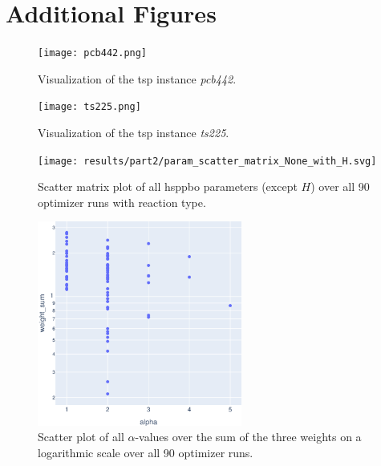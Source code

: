 \chapter{Additional Figures}
\label{chap:figures}

\begin{figure}[h]
	\centering
	\texttt{[image: pcb442.png]}
	\caption{Visualization of the \gls{tsp} instance \textit{pcb442}.}
	\label{fig:pcb442}
\end{figure}
\begin{figure}[h]
	\centering
	\texttt{[image: ts225.png]}
	\caption{Visualization of the \gls{tsp} instance \textit{ts225}.}
	\label{fig:ts225}
\end{figure}

\begin{figure}[h]
	\centering
	\texttt{[image: results/part2/param\_scatter\_matrix\_None\_with\_H.svg]}
	\caption[Scatter matrix plot of all \gls{hsppbo} parameters]{Scatter matrix plot of all \gls{hsppbo} parameters (except $H$) over all 90 optimizer runs with reaction type.}
	\label{fig:parameter_scatter_matrix_added}
\end{figure}
\begin{figure}[h]
	\centering
	\includegraphics[width=0.6\textwidth]{results/part2/alpha_weight_semilog_plot.svg}
	\caption[Scatter plot of all $\alpha$-values over the sum of the three weights]{Scatter plot of all $\alpha$-values over the sum of the three weights on a logarithmic scale over all 90 optimizer runs.}
	\label{fig:alpha_weight_semilog_plot}
\end{figure}
